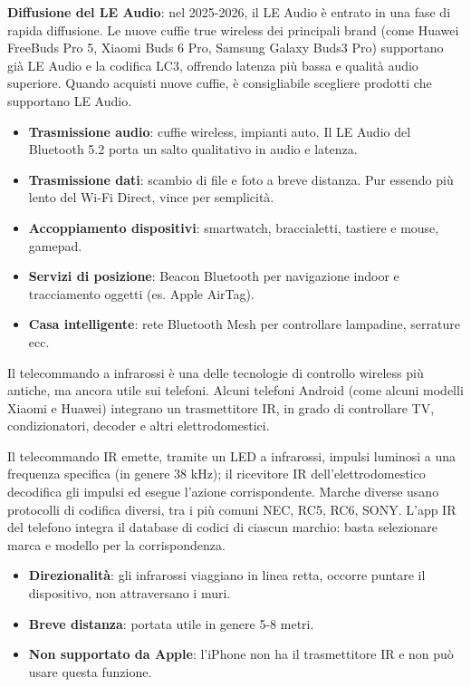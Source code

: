 \textbf{Diffusione del LE Audio}: nel 2025-2026, il LE Audio è entrato in una fase di rapida diffusione. Le nuove cuffie true wireless dei principali brand (come Huawei FreeBuds Pro 5, Xiaomi Buds 6 Pro, Samsung Galaxy Buds3 Pro) supportano già LE Audio e la codifica LC3, offrendo latenza più bassa e qualità audio superiore. Quando acquisti nuove cuffie, è consigliabile scegliere prodotti che supportano LE Audio.


\begin{itemize}
  \item \textbf{Trasmissione audio}: cuffie wireless, impianti auto. Il LE Audio del Bluetooth 5.2 porta un salto qualitativo in audio e latenza.
  \item \textbf{Trasmissione dati}: scambio di file e foto a breve distanza. Pur essendo più lento del Wi-Fi Direct, vince per semplicità.
  \item \textbf{Accoppiamento dispositivi}: smartwatch, braccialetti, tastiere e mouse, gamepad.
  \item \textbf{Servizi di posizione}: Beacon Bluetooth per navigazione indoor e tracciamento oggetti (es. Apple AirTag).
  \item \textbf{Casa intelligente}: rete Bluetooth Mesh per controllare lampadine, serrature ecc.
\end{itemize}


Il telecommando a infrarossi è una delle tecnologie di controllo wireless più antiche, ma ancora utile sui telefoni. Alcuni telefoni Android (come alcuni modelli Xiaomi e Huawei) integrano un trasmettitore IR, in grado di controllare TV, condizionatori, decoder e altri elettrodomestici.


Il telecommando IR emette, tramite un LED a infrarossi, impulsi luminosi a una frequenza specifica (in genere 38 kHz); il ricevitore IR dell'elettrodomestico decodifica gli impulsi ed esegue l'azione corrispondente. Marche diverse usano protocolli di codifica diversi, tra i più comuni NEC, RC5, RC6, SONY. L'app IR del telefono integra il database di codici di ciascun marchio: basta selezionare marca e modello per la corrispondenza.


\begin{itemize}
  \item \textbf{Direzionalità}: gli infrarossi viaggiano in linea retta, occorre puntare il dispositivo, non attraversano i muri.
  \item \textbf{Breve distanza}: portata utile in genere 5-8 metri.
  \item \textbf{Non supportato da Apple}: l'iPhone non ha il trasmettitore IR e non può usare questa funzione.
\end{itemize}

